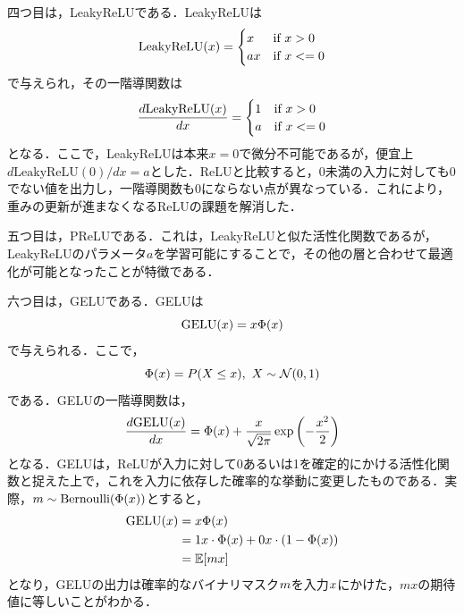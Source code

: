 \documentclass[12pt]{jarticle}
\numberwithin{equation}{section}    %
\numberwithin{figure}{section}      %
\numberwithin{table}{section}      %
\begin{document}
四つ目は，LeakyReLU\cite{maas2013rectifier}である．LeakyReLUは
\begin{equation}
    \text{LeakyReLU}(x) =
    \begin{cases}
        x  & \text{if $x > 0$}  \\
        ax & \text{if $x <= 0$}
    \end{cases}
\end{equation}
で与えられ，その一階導関数は
\begin{equation}
    \frac{d\text{LeakyReLU}(x)}{dx} =
    \begin{cases}
        1 & \text{if $x > 0$}  \\
        a & \text{if $x <= 0$}
    \end{cases}
\end{equation}
となる．ここで，LeakyReLUは本来$x = 0$で微分不可能であるが，便宜上$d\text{LeakyReLU}(0) / dx = a$とした．ReLUと比較すると，0未満の入力に対しても0でない値を出力し，一階導関数も0にならない点が異なっている．これにより，重みの更新が進まなくなるReLUの課題を解消した．

五つ目は，PReLU\cite{he2015delving}である．これは，LeakyReLUと似た活性化関数であるが，LeakyReLUのパラメータ$a$を学習可能にすることで，その他の層と合わせて最適化が可能となったことが特徴である．

六つ目は，GELU\cite{hendrycks2016gaussian}である．GELUは
\begin{equation}
    \text{GELU}(x) = x \Phi(x)
\end{equation}
で与えられる．ここで，
\begin{equation}
    \Phi(x) = P(X \le x), ~ X \sim \mathcal{N} (0, 1)
\end{equation}
である．GELUの一階導関数は，
\begin{equation}
    \frac{d\text{GELU}(x)}{dx} = \Phi(x) + \frac{x}{\sqrt{2\pi}}\exp\left(-\frac{x^{2}}{2}\right)
\end{equation}
となる．GELUは，ReLUが入力に対して0あるいは1を確定的にかける活性化関数と捉えた上で，これを入力に依存した確率的な挙動に変更したものである．実際，$m \sim \text{Bernoulli}(\Phi(x))$とすると，
\begin{align}
    \text{GELU}(x) & = x \Phi(x)                                                       \\
                             & = 1 x \cdot \Phi(x) + 0 x \cdot (1 - \Phi(x)) \\
                             & = \mathbb{E} [mx]
\end{align}
となり，GELUの出力は確率的なバイナリマスク$m$を入力$x$にかけた，$mx$の期待値に等しいことがわかる．
\end{document}

